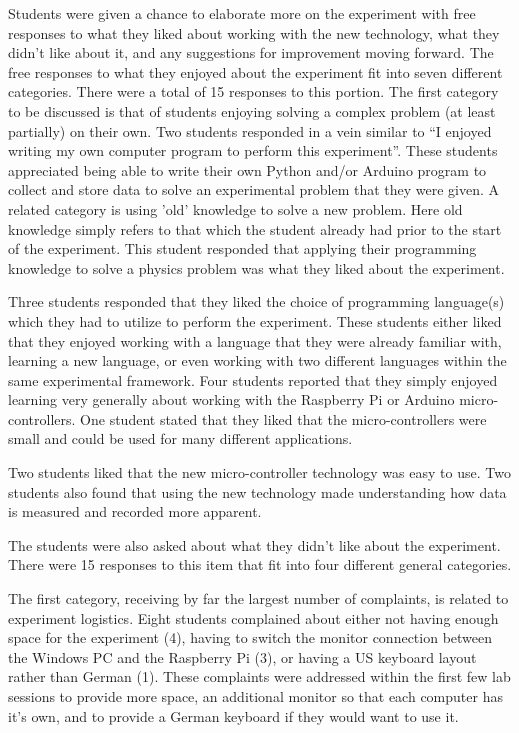 Students were given a chance to elaborate more on the experiment with free responses to what they liked about working with the new technology, what they didn't like about it, and any suggestions for improvement moving forward.
The free responses to what they enjoyed about the experiment fit into seven different categories.
There were a total of 15 responses to this portion.
The first category to be discussed is that of students enjoying solving a complex problem (at least partially) on their own.
Two students responded in a vein similar to ``I enjoyed writing my own computer program to perform this experiment''.
These students appreciated being able to write their own Python and/or Arduino program to collect and store data to solve an experimental problem that they were given.
A related category is using 'old' knowledge to solve a new problem.
Here old knowledge simply refers to that which the student already had prior to the start of the experiment.
This student responded that applying their programming knowledge to solve a physics problem was what they liked about the experiment.

Three students responded that they liked the choice of programming language(s) which they had to utilize to perform the experiment.
These students either liked that they enjoyed working with a language that they were already familiar with, learning a new language, or even working with two different languages within the same experimental framework.
Four students reported that they simply enjoyed learning very generally about working with the Raspberry Pi or Arduino micro-controllers.
One student stated that they liked that the micro-controllers were small and could be used for many different applications.

Two students liked that the new micro-controller technology was easy to use.
Two students also found that using the new technology made understanding how data is measured and recorded more apparent.

The students were also asked about what they didn't like about the experiment.
There were 15 responses to this item that fit into four different general categories.

The first category, receiving by far the largest number of complaints, is related to experiment logistics.
Eight students complained about either not having enough space for the experiment (4), having to switch the monitor connection between the Windows PC and the Raspberry Pi (3), or having a US keyboard layout rather than German (1).
These complaints were addressed within the first few lab sessions to provide more space, an additional monitor so that each computer has it's own, and to provide a German keyboard if they would want to use it.

